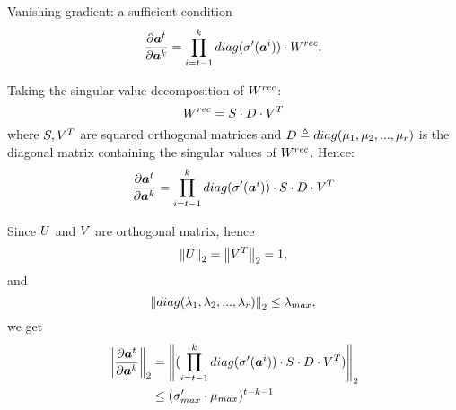 \begin{frame}{Vanishing gradient: a sufficient condition}
	\begin{equation}
	\frac{\partial \boldsymbol{a}^t}{\partial \boldsymbol{a}^k} = \prod_{i=t-1}^{k}  diag(\sigma'(\boldsymbol{a}^i)) \cdot W^{rec}.
	\label{eq:temporalComponent}
	\end{equation}
	
	Taking the singular value decomposition of $W^{rec}$:
	\begin{equation}
	W^{rec} =  S\cdot D\cdot V^T
	\end{equation}
	where $S,V^T$ are squared orthogonal matrices and $D\triangleq diag(\mu_1, \mu_2,...,\mu_r)$ is the diagonal matrix containing the singular values of $W^{rec}$.
	Hence:
	\begin{equation}
	\frac{\partial \boldsymbol{a}^t}{\partial \boldsymbol{a}^k} = \prod_{i=t-1}^{k}  diag(\sigma'(\boldsymbol{a}^i)) \cdot S\cdot D \cdot V^T
	\end{equation}
\end{frame}
\begin{frame}
	Since $U$ and $V$ are orthogonal matrix, hence $$\left\Vert U \right\Vert_2=\left\Vert V^T \right\Vert_2 = 1,$$ and $$\left\Vert diag(\lambda_1, \lambda_2,...,\lambda_r) \right\Vert_2 \leq \lambda_{max},$$ we get
	\begin{align}
	\left\Vert \frac{\partial \boldsymbol{a}^t}{\partial \boldsymbol{a}^k} \right\Vert_2 &= \left\Vert  (\prod_{i=t-1}^{k} diag(\sigma'(\boldsymbol{a}^i)) \cdot S\cdot D \cdot V^T) \right\Vert_2\\
	&\leq (\sigma'_{max} \cdot \mu_{max})^{t-k-1}
	\end{align}
\end{frame}

